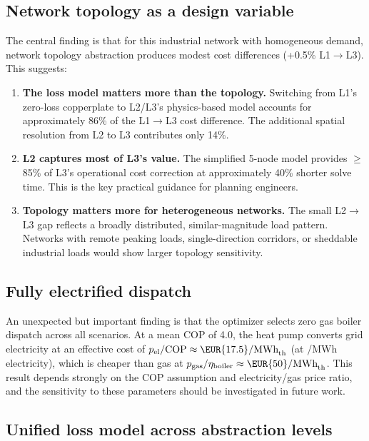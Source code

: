 \documentclass[a4paper,fleqn]{cas-dc}
\begin{document}
\subsection{Network topology as a design variable}

The central finding is that for this industrial network with homogeneous demand, network topology abstraction produces modest cost differences (+0.5\% L1$\to$L3). This suggests:

\begin{enumerate}
\item \textbf{The loss model matters more than the topology.} Switching from L1's zero-loss copperplate to L2/L3's physics-based model accounts for approximately 86\% of the L1$\to$L3 cost difference. The additional spatial resolution from L2 to L3 contributes only 14\%.

\item \textbf{L2 captures most of L3's value.} The simplified 5-node model provides $\geq$85\% of L3's operational cost correction at approximately 40\% shorter solve time. This is the key practical guidance for planning engineers.

\item \textbf{Topology matters more for heterogeneous networks.} The small L2$\to$L3 gap reflects a broadly distributed, similar-magnitude load pattern. Networks with remote peaking loads, single-direction corridors, or sheddable industrial loads would show larger topology sensitivity.
\end{enumerate}

\subsection{Fully electrified dispatch}

An unexpected but important finding is that the optimizer selects zero gas boiler dispatch across all scenarios. At a mean COP of 4.0, the heat pump converts grid electricity at an effective cost of $p_\mathrm{el}/\mathrm{COP} \approx \text{\EUR{17.5}/MWh}_\mathrm{th}$ (at /MWh electricity), which is cheaper than gas at $p_\mathrm{gas}/\eta_\mathrm{boiler} \approx \text{\EUR{50}/MWh}_\mathrm{th}$. This result depends strongly on the COP assumption and electricity/gas price ratio, and the sensitivity to these parameters should be investigated in future work.

\subsection{Unified loss model across abstraction levels}
\end{document}
